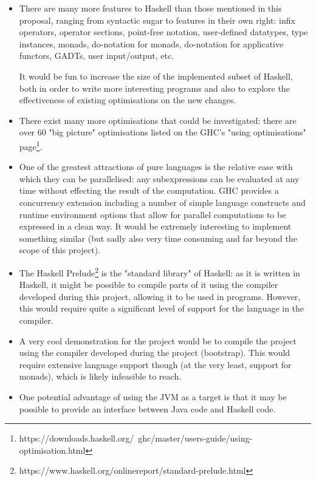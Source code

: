 \documentclass[12pt]{article}
\begin{document}
\begin{itemize}
\item
{

    There are many more features to Haskell than those mentioned in this proposal, ranging from syntactic sugar to
    features in their own right: infix operators, operator sections, point-free notation, user-defined datatypes, type
    instances, monads, do-notation for monads, do-notation for applicative functors, GADTs, user input/output, etc.

    It would be fun to increase the size of the implemented subset of Haskell, both in order to write more interesting
    programs and also to explore the effectiveness of existing optimisations on the new changes.

}
\item
{

    There exist many more optimisations that could be investigated: there are over 60 "big picture" optimisations listed
    on the GHC's "using optimisations"
    page\footnote{https://downloads.haskell.org/~ghc/master/users-guide/using-optimisation.html}.

}
\item
{

    One of the greatest attractions of pure languages is the relative ease with which they can be parallelised: any
    subexpressions can be evaluated at any time without effecting the result of the computation. GHC provides a
    concurrency extension including a number of simple language constructs and runtime environment options that allow
    for parallel computations to be expressed in a clean way. It would be extremely interesting to implement something
    similar (but sadly also very time consuming and far beyond the scope of this project).

}
\item
{

    The Haskell Prelude\footnote{https://www.haskell.org/onlinereport/standard-prelude.html} is the "standard library"
    of Haskell: as it is written in Haskell, it might be possible to compile parts of it using the compiler developed
    during this project, allowing it to be used in programs. However, this would require quite a significant level of
    support for the language in the compiler.

}
\item
{

    A very cool demonstration for the project would be to compile the project using the compiler developed during the
    project (bootstrap). This would require extensive language support though (at the very least, support for monads),
    which is likely infeasible to reach.

}
\item
{

    One potential advantage of using the JVM as a target is that it may be possible to provide an interface between Java
    code and Haskell code.

}
\end{itemize}
\end{document}
